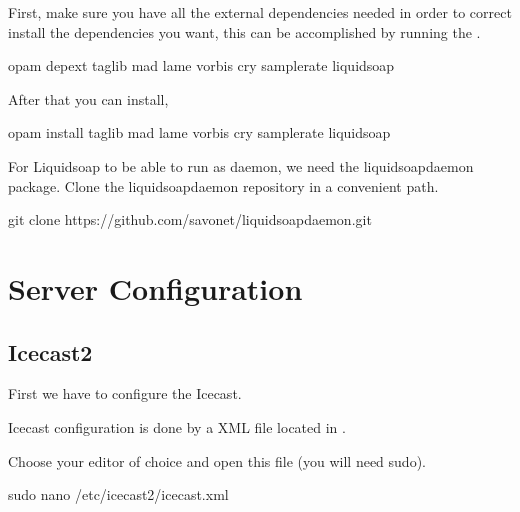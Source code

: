 \documentclass[letterpaper,10pt,english]{sphinxmanual}
\begin{document}
\sphinxAtStartPar
First, make sure you have all the external dependencies needed in order to correct install the
dependencies you want, this can be accomplished by running the .

\begin{sphinxVerbatim}[commandchars=\\\{\}]
opam depext taglib mad lame vorbis cry samplerate liquidsoap
\end{sphinxVerbatim}

\sphinxAtStartPar
After that you can install,

\begin{sphinxVerbatim}[commandchars=\\\{\}]
opam install taglib mad lame vorbis cry samplerate liquidsoap
\end{sphinxVerbatim}

\sphinxAtStartPar
For Liquidsoap to be able to run as daemon, we need the liquidsoap\sphinxhyphen{}daemon package.
Clone the liquidsoap\sphinxhyphen{}daemon repository in a convenient path.

\begin{sphinxVerbatim}[commandchars=\\\{\}]
git clone https://github.com/savonet/liquidsoap\PYGZhy{}daemon.git
\end{sphinxVerbatim}

\sphinxstepscope


\chapter{Server Configuration}
\label{\detokenize{server_config:server-configuration}}\label{\detokenize{server_config::doc}}

\section{Icecast2}
\label{\detokenize{server_config:icecast2}}
\sphinxAtStartPar
First we have to configure the Icecast.

\sphinxAtStartPar
Icecast configuration is done by a XML file located in .

\sphinxAtStartPar
Choose your editor of choice and open this file (you will need sudo).

\begin{sphinxVerbatim}[commandchars=\\\{\}]
sudo nano /etc/icecast2/icecast.xml
\end{sphinxVerbatim}
\end{document}
